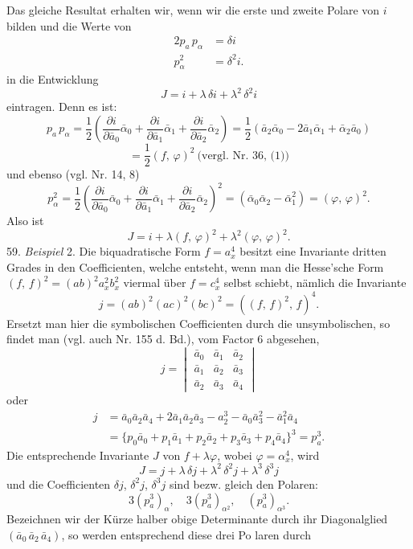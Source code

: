 \documentclass[11pt]{article}
\providecommand{\weberpage}[1]{}
\begin{document}
\weberpage{63}
Das gleiche Resultat erhalten wir, wenn wir die erste und zweite
Polare von $i$ bilden und die Werte von
\[
\begin{aligned}
2p_a\,p_\alpha &= \delta i\\
p_\alpha^2 &= \delta^2 i.
\end{aligned}
\]
in die Entwicklung
\[
J = i + \lambda\,\delta i + \lambda^2\,\delta^2 i
\]
eintragen. Denn es ist:
\[
p_a\,p_\alpha = \frac{1}{2}\left(\frac{\partial i}{\partial \bar a_0}\bar\alpha_0+\frac{\partial i}{\partial \bar a_1}\bar\alpha_1+\frac{\partial i}{\partial \bar a_2}\bar\alpha_2\right) = \frac{1}{2}(\bar a_2\bar\alpha_0-2\bar a_1\bar\alpha_1+\bar\alpha_2\bar a_0)
\]
\[
= \frac{1}{2}(f,\,\varphi)^2 \ \text{(vergl. Nr. 36, (1))}
\]
und ebenso (vgl. Nr. 14, 8)
\[
p_\alpha^2 = \frac{1}{2}\left(\frac{\partial i}{\partial \bar a_0}\bar\alpha_0+\frac{\partial i}{\partial \bar a_1}\bar\alpha_1+\frac{\partial i}{\partial \bar a_2}\bar\alpha_2\right)^2 = (\bar\alpha_0\bar\alpha_2-\bar\alpha_1^2) = (\varphi,\,\varphi)^2.
\]
Also ist
\[
J = i + \lambda(f,\,\varphi)^2 + \lambda^2(\varphi,\,\varphi)^2.
\]
59. \textit{Beispiel} 2. Die biquadratische Form $f=a_x^4$ besitzt eine In\-variante dritten Grades in den Coefficienten, welche entsteht, wenn
man die Hesse'sche Form $(f,\,f)^2=(ab)^2a_x^2b_x^2$ viermal über $f=c_x^4$
selbst schiebt, nämlich die Invariante
\[
j = (ab)^2(ac)^2(bc)^2 = ((f,\,f)^2,\,f)^4.
\]
Ersetzt man hier die symbolischen Coefficienten durch die unsymbo\-lischen, so findet man (vgl. auch Nr. 155 d. Bd.), vom Factor 6 abge\-sehen,
\[
j = \begin{vmatrix} \bar a_0 & \bar a_1 & \bar a_2\\ \bar a_1 & \bar a_2 & \bar a_3\\ \bar a_2 & \bar a_3 & \bar a_4 \end{vmatrix}
\]
oder
\[
\begin{aligned}
j &= \bar a_0\bar a_2\bar a_4 + 2\bar a_1\bar a_2\bar a_3 - a_2^3 - \bar a_0\bar a_3^2 - \bar a_1^2\bar a_4 %
\\
&= \{p_0\bar a_0+p_1\bar a_1+p_2\bar a_2+p_3\bar a_3+p_4\bar a_4\}^3 = p_a^3.
\end{aligned}
\]
Die entsprechende Invariante $J$ von $f+\lambda\varphi$, wobei $\varphi=\alpha_x^4$, wird
\[
J = j + \lambda\,\delta j + \lambda^2\,\delta^2 j + \lambda^3\,\delta^3 j
\]
und die Coefficienten $\delta j$, $\delta^2 j$, $\delta^3 j$ sind bezw. gleich den Polaren:
\[
3(p_a^3)_\alpha,\quad 3(p_a^3)_{\alpha^2},\quad (p_a^3)_{\alpha^3}.
\]
Bezeichnen wir der Kürze halber obige Determinante durch
ihr Diagonalglied $(\bar a_0\,\bar a_2\,\bar a_4)$, so werden entsprechend diese drei Po\-
laren durch
\end{document}
